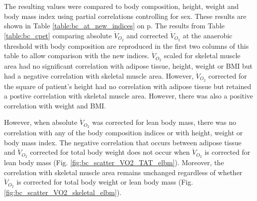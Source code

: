 The resulting values were compared to body composition, height, weight and body mass index using partial correlations controlling for sex. 
These results are shown in Table \ref{table:bc_at_new_indices} on p\pageref{table:bc_at_new_indices}. 
The results from Table \ref{table:bc_cpet} comparing absolute $\dot{V}_{O_2}$ and corrected $\dot{V}_{O_2}$ at the anaerobic threshold with body composition are reproduced in the first two columns of this table to allow comparison with the new indices. $\dot{V}_{O_2}$ scaled for skeletal muscle area had no significant correlation with adipose tissue, height, weight or BMI but had a negative correlation with skeletal muscle area. 
However, $\dot{V}_{O_2}$ corrected for the square of patient's height had no correlation with adipose tissue but retained a postive correlation with skeletal muscle area. 
However, there was also a positive correlation with weight and BMI. 

However, when absolute $\dot{V}_{O_2}$ was corrected for lean body mass, there was no correlation with any of the body composition indices or with height, weight or body mass index. 
The negative correlation that occurs between adipose tissue and $\dot{V}_{O_2}$ corrected for total body weight does not occur when $\dot{V}_{O_2}$ is corrected for lean body mass (Fig. \ref{fig:bc_scatter_VO2_TAT_elbm}). 
Moreover, the correlation with skeletal muscle area remains unchanged regardless of whether $\dot{V}_{O_2}$ is corrected for total body weight or lean body mass (Fig. \ref{fig:bc_scatter_VO2_skeletal_elbm}).

